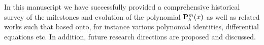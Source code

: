 In this manuscript we have successfully provided a comprehensive historical survey
of the milestones and evolution of the polynomial ${\mathbf{P}}\sp{m} \sb{b}(x)$
as well as related works such that based onto, for instance various polynomial identities, differential equations etc.
In addition, future research directions are proposed and discussed.
